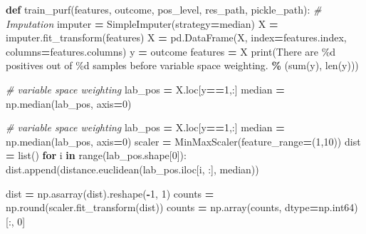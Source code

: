 \documentclass[
  11pt,
  oneside]{book}
\newenvironment{Shaded}{\begin{snugshade}}{\end{snugshade}}
\newcommand{\BuiltInTok}[1]{#1}
\newcommand{\CommentTok}[1]{\textcolor[rgb]{0.56,0.35,0.01}{\textit{#1}}}
\newcommand{\ControlFlowTok}[1]{\textcolor[rgb]{0.13,0.29,0.53}{\textbf{#1}}}
\newcommand{\DecValTok}[1]{\textcolor[rgb]{0.00,0.00,0.81}{#1}}
\newcommand{\KeywordTok}[1]{\textcolor[rgb]{0.13,0.29,0.53}{\textbf{#1}}}
\newcommand{\NormalTok}[1]{#1}
\newcommand{\OperatorTok}[1]{\textcolor[rgb]{0.81,0.36,0.00}{\textbf{#1}}}
\newcommand{\SpecialCharTok}[1]{\textcolor[rgb]{0.00,0.00,0.00}{#1}}
\newcommand{\StringTok}[1]{\textcolor[rgb]{0.31,0.60,0.02}{#1}}
\begin{document}
\begin{Shaded}
\begin{Highlighting}[]
\KeywordTok{def}\NormalTok{ train\_purf(features, outcome, pos\_level, res\_path, pickle\_path):}
    \CommentTok{\# Imputation}
\NormalTok{    imputer }\OperatorTok{=}\NormalTok{ SimpleImputer(strategy}\OperatorTok{=}\StringTok{\textquotesingle{}median\textquotesingle{}}\NormalTok{)}
\NormalTok{    X }\OperatorTok{=}\NormalTok{ imputer.fit\_transform(features)}
\NormalTok{    X }\OperatorTok{=}\NormalTok{ pd.DataFrame(X, index}\OperatorTok{=}\NormalTok{features.index, columns}\OperatorTok{=}\NormalTok{features.columns)}
\NormalTok{    y }\OperatorTok{=}\NormalTok{ outcome}
\NormalTok{    features }\OperatorTok{=}\NormalTok{ X}
    \BuiltInTok{print}\NormalTok{(}\StringTok{\textquotesingle{}There are }\SpecialCharTok{\%d}\StringTok{ positives out of }\SpecialCharTok{\%d}\StringTok{ samples before variable space weighting.\textquotesingle{}} \OperatorTok{\%}\NormalTok{ (}\BuiltInTok{sum}\NormalTok{(y), }\BuiltInTok{len}\NormalTok{(y)))}

    \CommentTok{\# variable space weighting}
\NormalTok{    lab\_pos }\OperatorTok{=}\NormalTok{ X.loc[y}\OperatorTok{==}\DecValTok{1}\NormalTok{,:]}
\NormalTok{    median }\OperatorTok{=}\NormalTok{ np.median(lab\_pos, axis}\OperatorTok{=}\DecValTok{0}\NormalTok{)}

    \CommentTok{\# variable space weighting}
\NormalTok{    lab\_pos }\OperatorTok{=}\NormalTok{ X.loc[y}\OperatorTok{==}\DecValTok{1}\NormalTok{,:]}
\NormalTok{    median }\OperatorTok{=}\NormalTok{ np.median(lab\_pos, axis}\OperatorTok{=}\DecValTok{0}\NormalTok{)}
\NormalTok{    scaler }\OperatorTok{=}\NormalTok{ MinMaxScaler(feature\_range}\OperatorTok{=}\NormalTok{(}\DecValTok{1}\NormalTok{,}\DecValTok{10}\NormalTok{))}
\NormalTok{    dist }\OperatorTok{=} \BuiltInTok{list}\NormalTok{()}
    \ControlFlowTok{for}\NormalTok{ i }\KeywordTok{in} \BuiltInTok{range}\NormalTok{(lab\_pos.shape[}\DecValTok{0}\NormalTok{]):}
\NormalTok{        dist.append(distance.euclidean(lab\_pos.iloc[i, :], median))}
        
\NormalTok{    dist }\OperatorTok{=}\NormalTok{ np.asarray(dist).reshape(}\OperatorTok{{-}}\DecValTok{1}\NormalTok{, }\DecValTok{1}\NormalTok{)}
\NormalTok{    counts }\OperatorTok{=}\NormalTok{ np.}\BuiltInTok{round}\NormalTok{(scaler.fit\_transform(dist))}
\NormalTok{    counts }\OperatorTok{=}\NormalTok{ np.array(counts, dtype}\OperatorTok{=}\NormalTok{np.int64)[:, }\DecValTok{0}\NormalTok{]}


\end{Highlighting}
\end{Shaded}
\end{document}
